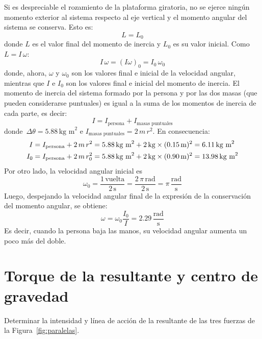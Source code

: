 \documentclass[addpoints]{exam}
\begin{document}
\begin{questions}
    \begin{solution}
    Si es despreciable el rozamiento de la plataforma giratoria, no se ejerce ningún momento exterior al sistema respecto al eje vertical y el momento angular del sistema se conserva. Esto es: $$L = L_0$$ donde $L$ es el valor final del momento de inercia y $L_0$ es su valor inicial. Como $L = I \, \omega$: $$I \, \omega = \left(I \omega\right)_0 = I_0 \, \omega_0$$ donde, ahora, $\omega$ y $\omega_0$ son los valores final e inicial de la velocidad angular, mientras que $I$ e $I_0$ son los valores final e inicial del momento de inercia. El momento de inercia del sistema formado por la persona y por las dos masas (que pueden considerarse puntuales) es igual a la suma de los momentos de inercia de cada parte, es decir: $$I = I_\text{persona} + I_\text{masas puntuales}$$ donde $\, \Delta \theta = 5.88 \, \text{kg m}^2$ e $I_\text{masas puntuales} = 2 \, m \, r^2$. En consecuencia:
    \begin{align*}
        I &= I_\text{persona} + 2 \, m \, r^2 = 5.88 \, \text{kg m}^2 + 2 \time 5 \, \text{kg} \times (0.15 \, \text{m})^2 = 6.11 \, \text{kg m}^2 \\
        I_0 &= I_\text{persona} + 2 \, m \, r_0^2 = 5.88 \, \text{kg m}^2 + 2 \time 5 \, \text{kg} \times (0.90 \, \text{m})^2 = 13.98 \, \text{kg m}^2 
    \end{align*} Por otro lado, la velocidad angular inicial es $$\omega_0 = \frac{1 \, \text{vuelta}}{2 \, \text{s}} = \frac{2 \, \pi \, \text{rad}}{2 \, \text{s}} = \pi \, \frac{\text{rad}}{\text{s}}$$ Luego, despejando la velocidad angular final de la expresión de la conservación del momento angular, se obtiene: $$\omega = \omega_0 \frac{I_0}{I} = 2.29 \, \frac{\text{rad}}{\text{s}}$$ Es decir, cuando la persona baja las manos, su velocidad angular aumenta un poco más del doble.
    \end{solution}

    \section{Torque de la resultante y centro de gravedad}

    \question Determinar la intensidad y línea de acción de la resultante de las tres fuerzas de la Figura~\ref{fig:paralelas}.


\end{questions}
\end{document}
